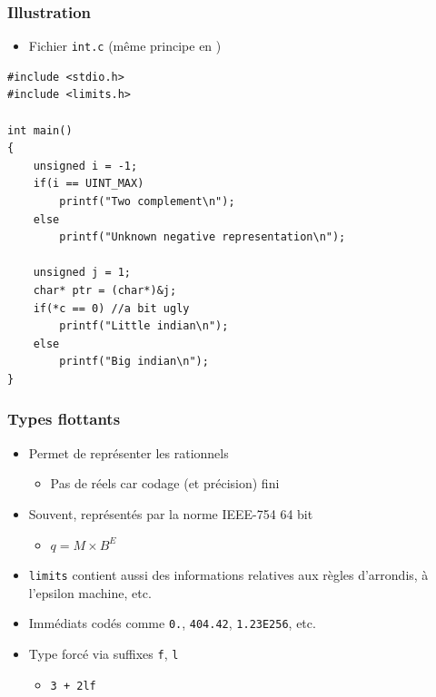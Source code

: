 \begin{frame}[containsverbatim]
\frametitle{Illustration}
\begin{itemize}
\item Fichier \texttt{int.c} (même principe en \cpp)
\end{itemize}
\begin{lstlisting}
#include <stdio.h>
#include <limits.h>

int main()
{
	unsigned i = -1;
	if(i == UINT_MAX)
		printf("Two complement\n");
	else
		printf("Unknown negative representation\n");
		
	unsigned j = 1;
	char* ptr = (char*)&j;
	if(*c == 0) //a bit ugly
		printf("Little indian\n");
	else
		printf("Big indian\n");
}
\end{lstlisting}
\end{frame}

\begin{frame}
\frametitle{Types flottants}
\begin{itemize}[<+->]
\item Permet de représenter les rationnels
	\begin{itemize}
	\item Pas de réels car codage (et précision) fini
	\end{itemize}
\item Souvent, représentés par la norme IEEE-754 64 bit
	\begin{itemize}
	\item $q = M \times B^E$
	\end{itemize}
\item \texttt{limits} contient aussi des informations relatives aux règles d'arrondis, à l'epsilon machine, etc.
\item Immédiats codés comme \texttt{0.}, \texttt{404.42}, \texttt{1.23E256}, etc.
\item Type forcé via suffixes \texttt{f}, \texttt{l}
	\begin{itemize}
	\item \texttt{3 + 2lf}
	\end{itemize}
\end{itemize}
\end{frame}

